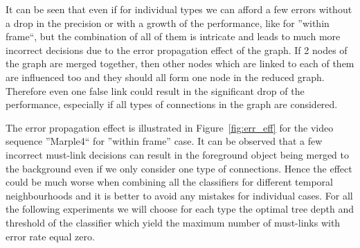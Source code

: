 It can be seen that even if for individual types we can afford a few errors without a drop in the precision or with a growth of the performance, like for ''within frame``, but the combination of all of them is intricate and leads to much more
incorrect decisions due to the error propagation effect of the graph. If 2 nodes of the graph are merged together, then other nodes which are linked to each of them are influenced too and they should all form one node in the reduced
graph. Therefore even one false link could result in the significant drop of the performance, especially if all types of connections in the graph are considered.

The error propagation effect is illustrated in Figure~\ref{fig:err_eff} for the video sequence ''Marple4`` for ''within frame'' case. It can be observed that a few incorrect must-link decisions can result in the foreground object being
merged to the background even if we only consider one type of connections.
Hence the effect could be much worse when combining all the classifiers for different temporal neighbourhoods and it is better to avoid any mistakes for individual cases. 
For all the following experiments we will choose for each type the optimal tree depth and threshold
of the classifier which yield the maximum number of must-links with error rate equal zero.

